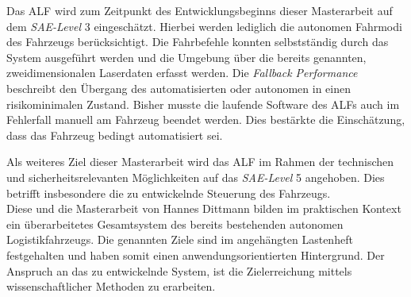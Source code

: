 		Das ALF wird zum Zeitpunkt des Entwicklungsbeginns dieser Masterarbeit auf dem \textit{SAE-Level} 3 eingeschätzt. Hierbei werden lediglich die autonomen Fahrmodi des Fahrzeugs berücksichtigt. Die Fahrbefehle konnten selbstständig durch das System ausgeführt werden und die Umgebung über die bereits genannten, zweidimensionalen Laserdaten erfasst werden. Die \textit{Fallback Performance} beschreibt den Übergang des automatisierten oder autonomen in einen risikominimalen Zustand. Bisher musste die laufende Software des ALFs auch im Fehlerfall manuell am Fahrzeug beendet werden. Dies bestärkte die Einschätzung, dass das Fahrzeug bedingt automatisiert sei.	
		
		
		
		Als weiteres Ziel dieser Masterarbeit wird das ALF im Rahmen der technischen und sicherheitsrelevanten Möglichkeiten auf das \textit{SAE-Level} 5 angehoben. Dies betrifft insbesondere die zu entwickelnde Steuerung des Fahrzeugs.\\
		
		Diese und die Masterarbeit von Hannes Dittmann bilden im praktischen Kontext ein überarbeitetes Gesamtsystem des bereits bestehenden autonomen Logistikfahrzeugs. Die genannten Ziele sind im angehängten Lastenheft festgehalten und haben somit einen anwendungsorientierten Hintergrund. Der Anspruch an das zu entwickelnde System, ist die Zielerreichung mittels wissenschaftlicher Methoden zu erarbeiten.  
		
		
	